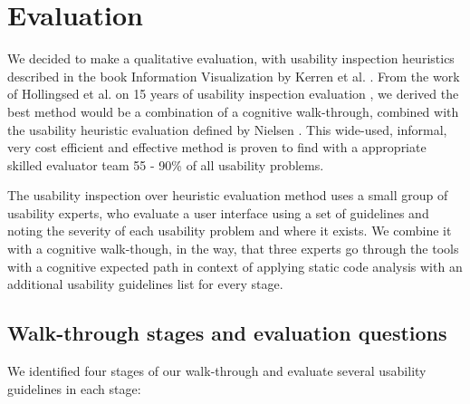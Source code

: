 \documentclass[conference]{IEEEtran}
\begin{document}
\section{Evaluation}
\label{sec:evaluation}
We decided to make a qualitative evaluation, with usability inspection heuristics described in the book Information Visualization by Kerren et al. \cite{InformationVisualizationBook}.
From the work of Hollingsed et al. on 15 years of usability inspection evaluation \cite{15yearsUsabilityEvaluation}, we derived the best method would be a combination of a cognitive walk-through, combined with the usability heuristic evaluation defined by Nielsen \cite{Nielsen:UsabilityInspectionMethods}.
This wide-used, informal, very cost efficient and effective method is proven to find with a appropriate skilled evaluator team 55 - 90\% of all usability problems.


The usability inspection over heuristic evaluation method uses a small group of usability experts, who evaluate a
user interface using a set of guidelines and noting the severity of
each usability problem and where it exists. 
We combine it with a cognitive walk-though, in the way, that three experts go through the tools with a cognitive expected path in context of applying static code analysis with an additional usability guidelines list for every stage.


\subsection{Walk-through stages and evaluation questions}
\label{subsec:walkthrough}

We identified four stages of our walk-through and evaluate several usability guidelines in each stage:
\end{document}
